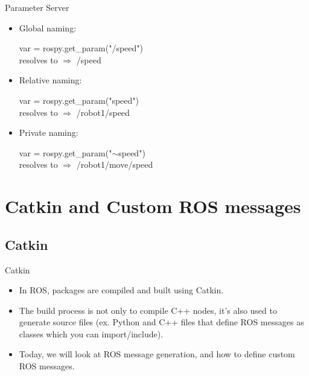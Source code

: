 \documentclass{beamer}
\begin{document}
\begin{frame}{Parameter Server}

    \begin{itemize}
        \item Global naming:
        \begin{focus}
            \centering
            \fontsize{9}{1} \ttfamily  var = rospy.get\_param("/speed") \\ \vspace{0.2cm}  resolves to  $\Rightarrow$ {\color{red} /speed}
        \end{focus}
        
        \item Relative naming:
        \begin{focus}
            \centering
            \fontsize{9}{1} \ttfamily var = rospy.get\_param("speed")\\ \vspace{0.2cm}  resolves to  $\Rightarrow$ {\color{red} /robot1/speed}
        \end{focus}  
        
        \item Private naming:
        \begin{focus}
            \centering
            \fontsize{9}{1} \ttfamily var = rospy.get\_param("$\sim$speed")\\ \vspace{0.2cm}  resolves to  $\Rightarrow$ {\color{red} /robot1/move/speed}
        \end{focus}        
        
    \end{itemize}
    
\end{frame}






\section{Catkin and Custom ROS messages}



\subsection{Catkin}


\begin{frame}{Catkin}
    
    \begin{itemize}
        \item In ROS, packages are compiled and built using Catkin.
        
        \item The build process is not only to compile C++ nodes, it's also used to generate source files (ex. Python and C++ files that define ROS messages as classes which you can import/include).
        
        \item Today, we will look at ROS message generation, and how to define custom ROS messages.
        
    \end{itemize}
    \end{frame}
    
\end{document}
